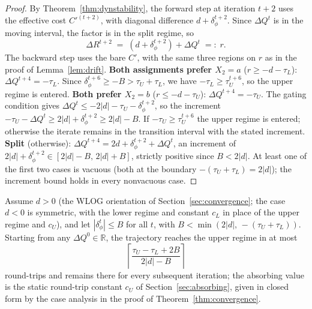 \begin{proof}
By Theorem~\ref{thm:dynstability}, the forward step at iteration $t+2$ uses the effective cost $C'^{(t+2)}$, with diagonal difference $d + \delta^{t+2}_\phi$.  Since $\Delta Q^t$ is in the moving interval, the factor is in the split regime, so
\[
    \Delta R^{t+2} \;=\; (d+\delta^{t+2}_\phi) + \Delta Q^t \;=:\; r .
\]
The backward step uses the bare $C'$, with the same three regions on $r$ as in the proof of Lemma~\ref{lem:drift}.
\smallskip\noindent\textbf{Both assignments prefer $X_2=a$} ($r \geq -d-\tau_L$): $\Delta Q^{t+4} = -\tau_L$.  Since $\delta^{t+6}_\phi \geq -B > \tau_U+\tau_L$, we have $-\tau_L \geq \tau_U^{t+6}$, so the upper regime is entered.
\smallskip\noindent\textbf{Both prefer $X_2=b$} ($r \leq -d-\tau_U$): $\Delta Q^{t+4} = -\tau_U$.  The gating condition gives $\Delta Q^t \leq -2|d| - \tau_U - \delta^{t+2}_\phi$, so the increment $-\tau_U - \Delta Q^t \geq 2|d| + \delta^{t+2}_\phi \geq 2|d|-B$.  If $-\tau_U \geq \tau_U^{t+6}$ the upper regime is entered; otherwise the iterate remains in the transition interval with the stated increment.
\smallskip\noindent\textbf{Split} (otherwise): $\Delta Q^{t+4} = 2d+\delta^{t+2}_\phi+\Delta Q^t$, an increment of $2|d|+\delta^{t+2}_\phi \in [2|d|-B,\,2|d|+B]$, strictly positive since $B<2|d|$.
\smallskip\noindent At least one of the first two cases is vacuous (both at the boundary $-(\tau_U+\tau_L) = 2|d|$); the increment bound holds in every nonvacuous case. \qedhere
\end{proof}
\begin{theorem}\label{thm:dyncvg}
Assume $d > 0$ (the WLOG orientation of Section~\ref{sec:convergence}; the case $d<0$ is symmetric, with the lower regime and constant $c_L$ in place of the upper regime and $c_U$), and let $|\delta^t_\phi| \leq B$ for all $t$, with $B < \min(2|d|,\,-(\tau_U+\tau_L))$.  Starting from any $\Delta Q^0 \in \mathbb{R}$, the trajectory reaches the upper regime in at most
\[
    \left\lceil \frac{\tau_U - \tau_L + 2B}{2|d| - B} \right\rceil
\]
round-trips and remains there for every subsequent iteration; the absorbing value is the static round-trip constant $c_U$ of Section~\ref{sec:absorbing}, given in closed form by the case analysis in the proof of Theorem~\ref{thm:convergence}.
\end{theorem}
